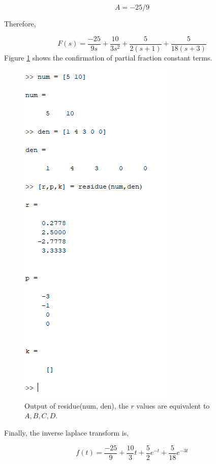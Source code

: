 \documentclass[12pt]{article}
\numberwithin{equation}{section}
\begin{document}
  \begin{equation}
    A = -25/9
  \end{equation}

  Therefore,

  \begin{equation}
    F(s) = \frac{-25}{9s} + \frac{10}{3s^2} + \frac{5}{2(s + 1)} + \frac{5}{18(s + 3)}
  \end{equation}
  Figure \ref{fig:fig1} shows the confirmation of partial fraction constant terms.
  \begin{figure}
    \centering
    \includegraphics{figures/rpk.png}
    \caption{Output of residue(num, den), the $ r $ values are equivalent to $ A,B,C,D. $}
    \label{fig:fig1}
  \end{figure}

  Finally, the inverse laplace transform is,

  \begin{equation}
    f(t) = \frac{-25}{9} + \frac{10}{3}t + \frac{5}{2}e^{-t} + \frac{5}{18}e^{-3t}
  \end{equation}
\end{document}
